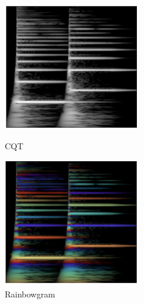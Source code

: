 \begin{figure}[b]
\centering
\begin{minipage}[b]{0.48\columnwidth}
\centering
\includegraphics[width=\columnwidth]{figure/cqt.png}
\caption{CQT}
\label{fig:cqt}
\end{minipage}
\begin{minipage}[b]{0.48\columnwidth}
\centering
\includegraphics[width=\columnwidth]{figure/rainbowgram.png}
\caption{Rainbowgram}
\label{fig:rainbowgram}
\end{minipage}
\end{figure}
    